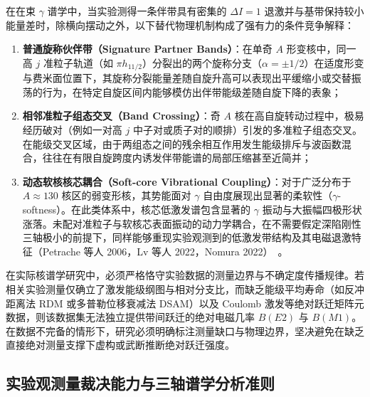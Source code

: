 在在束 $\gamma$ 谱学中，当实验测得一条伴带具有密集的 $\Delta I = 1$ 退激并与基带保持较小能量差时，除横向摆动之外，以下替代物理机制构成了强有力的条件竞争解释：
\begin{enumerate}
\item \textbf{普通旋称伙伴带（Signature Partner Bands）}：在单奇 $A$ 形变核中，同一高 $j$ 准粒子轨道（如 $\pi h_{11/2}$）分裂出的两个旋称分支（$\alpha = \pm 1/2$）在适度形变与费米面位置下，其旋称分裂能量差随自旋升高可以表现出平缓缩小或交替振荡的行为，在特定自旋区间内能够模仿出伴带能级差随自旋下降的表象；
\item \textbf{相邻准粒子组态交叉（Band Crossing）}：奇 $A$ 核在高自旋转动过程中，极易经历破对（例如一对高 $j$ 中子对或质子对的顺排）引发的多准粒子组态交叉。在能级交叉区域，由于两组态之间的残余相互作用发生能级排斥与波函数混合，往往在有限自旋跨度内诱发伴带能谱的局部压缩甚至近简并；
\item \textbf{动态软核核芯耦合（Soft-core Vibrational Coupling）}：对于广泛分布于 $A \approx 130$ 核区的弱变形核，其势能面对 $\gamma$ 自由度展现出显著的柔软性（$\gamma$-softness）。在此类体系中，核芯低激发谱包含显著的 $\gamma$ 振动与大振幅四极形状涨落。未配对准粒子与软核芯表面振动的动力学耦合，在不需要假定深陷刚性三轴极小的前提下，同样能够重现实验观测到的低激发带结构及其电磁退激特征（Petrache 等人 2006，Lv 等人 2022，Nomura 2022）~\cite{petrache-2006-near-degenerate-chiral-misinterpretation,lv-2022-evidence-against-wobbling-135pr,nomura-2022-questioning-wobbling-ibfm}。
\end{enumerate}

在实际核谱学研究中，必须严格恪守实验数据的测量边界与不确定度传播规律。若相关实验测量仅确立了激发能级纲图与相对分支比，而缺乏能级平均寿命（如反冲距离法 RDM 或多普勒位移衰减法 DSAM）以及 Coulomb 激发等绝对跃迁矩阵元数据，则该数据集无法独立提供带间跃迁的绝对电磁几率 $B(E2)$ 与 $B(M1)$。在数据不完备的情形下，研究必须明确标注测量缺口与物理边界，坚决避免在缺乏直接绝对测量支撑下虚构或武断推断绝对跃迁强度。

\subsection{实验观测量裁决能力与三轴谱学分析准则}\label{sec:3-4-5}

